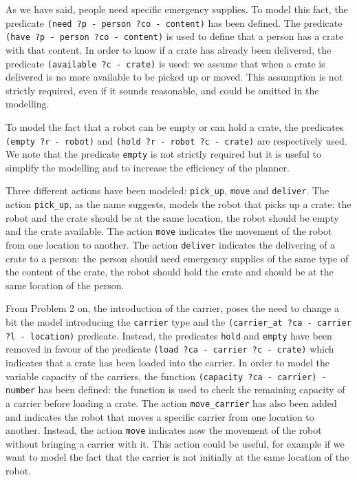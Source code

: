 As we have said, people need specific emergency supplies. To model this fact, the predicate
\texttt{(need ?p - person ?co - content)} has been defined. The predicate 
\texttt{(have ?p - person ?co - content)} is used to define that a person has a crate with that content.
In order to know if a crate has already been delivered, the predicate \texttt{(available ?c - crate)}
is used: we assume that when a crate is delivered is no more available to be picked up or moved. %
This assumption is not strictly required, even if it sounds reasonable, and could be omitted in the modelling.


To model the fact that a robot can be empty or can hold a crate, the predicates \texttt{(empty ?r - robot)} and
\texttt{(hold ?r - robot ?c - crate)} are respectively used.
We note that the predicate \texttt{empty} is not strictly required but it is useful to simplify the modelling
and to increase the efficiency of the planner.


Three different actions have been modeled: \texttt{pick\_up}, 
\texttt{move} and \texttt{deliver}.
The action \texttt{pick\_up}, as the name suggests, models the robot that picks up a crate:
the robot and the crate should be at the same location, the robot should be empty and the crate available.
The action \texttt{move} indicates the movement of the robot from one location to another.
The action \texttt{deliver} indicates the delivering of a crate to a person: the person should need emergency
supplies of the same type of the content of the crate, the robot should hold the crate and should be at the 
same location of the person.


From Problem 2 on, the introduction of the carrier, poses the need to change a bit the model 
introducing the \texttt{carrier} type and the \texttt{(carrier\_at ?ca - carrier ?l - location)} predicate.
Instead, the predicates \texttt{hold} and \texttt{empty} have been removed in favour of the predicate
\texttt{(load ?ca - carrier ?c - crate)} which indicates that a crate has been loaded into the carrier.
In order to model the variable capacity of the carriers, the function \texttt{(capacity ?ca - carrier) - number}
has been defined: the function is used to check the remaining capacity of a carrier before loading a crate.
The action \texttt{move\_carrier} has also been added and indicates the robot that moves a specific carrier 
from one location to another.
Instead, the action \texttt{move} indicates now the movement of the robot without bringing a carrier with it.
This action could be useful, for example if we want to model the fact that the carrier is not initially at 
the same location of the robot.

